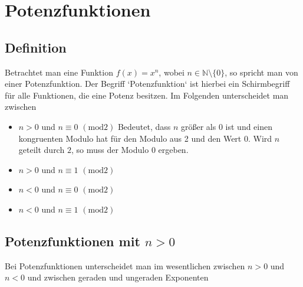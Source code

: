 \pagebreak
\section{Potenzfunktionen}\label{sec:Potenzfunktionen}
\subsection{Definition}\label{sec:Potenzfunktionen/Definition}
Betrachtet man eine Funktion $f(x)=x^n$, wobei $n\in\mathbb{N}\setminus\{0\}$, so spricht man von einer Potenzfunktion. Der Begriff `{}Potenzfunktion`{} ist hierbei ein Schirmbegriff für alle Funktionen, die eine Potenz besitzen. Im Folgenden unterscheidet man zwischen
\begin{itemize}
	\item $n>0$ und $ n\equiv0$ $(\mathrm{mod}2)$ Bedeutet, dass $n$ größer als 0 ist und einen kongruenten Modulo hat für den Modulo aus 2 und den Wert $0$. Wird $n$ geteilt durch $2$, so muss der Modulo $0$ ergeben.
	\item $n>0$ und $ n\equiv1$ $(\mathrm{mod}2)$
	\item $n<0$ und $ n\equiv0 $ $(\mathrm{mod}2)$
	\item $n<0$ und $ n\equiv1$ $(\mathrm{mod}2)$
\end{itemize}
\pagebreak
\subsection{Potenzfunktionen mit $n>0$}\label{sec:Potenzfunktionen/Potenzfunktionen mit positivem Exponenten}
Bei Potenzfunktionen unterscheidet man im wesentlichen zwischen $n>0$ und $n<0$ und zwischen geraden und ungeraden Exponenten

